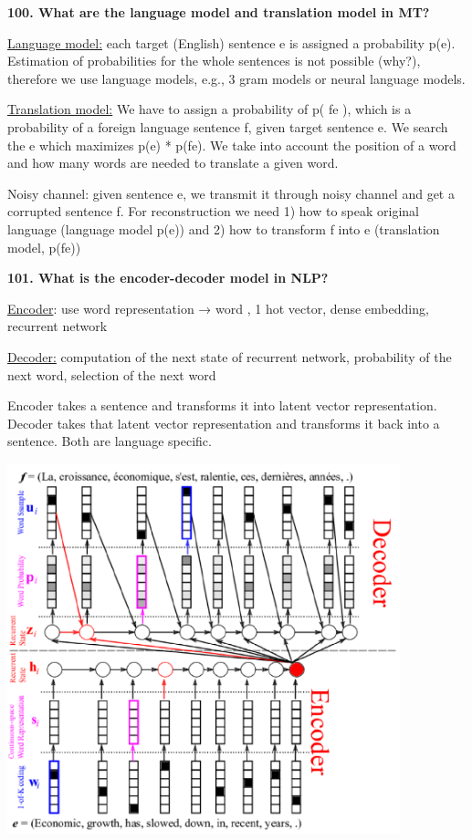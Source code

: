 \textbf{100. What are the language model and translation model in MT?}

\underline{Language model:} each target (English) sentence e is assigned
a probability p(e). Estimation of probabilities for the whole sentences
is not possible (why?), therefore we use language models, e.g., 3 gram
models or neural language models.

\underline{Translation model:} We have to assign a probability of p(
f\textbar e ), which is a probability of a foreign language sentence f,
given target sentence e. We search the e which maximizes p(e) *
p(f\textbar e). We take into account the position of a word and how many
words are needed to translate a given word.

Noisy channel: given sentence e, we transmit it through noisy channel
and get a corrupted sentence f. For reconstruction we need 1) how to
speak original language (language model p(e)) and 2) how to transform f
into e (translation model, p(f\textbar e))

\textbf{101. What is the encoder-decoder model in NLP?}

\underline{Encoder}: use word representation → word , 1 hot vector,
dense embedding, recurrent network

\underline{Decoder:} computation of the next state of recurrent network,
probability of the next word, selection of the next word

Encoder takes a sentence and transforms it into latent vector
representation. Decoder takes that latent vector representation and
transforms it back into a sentence. Both are language specific.

\includegraphics[width=4.48438in,height=4.22366in]{media/image40.png}

